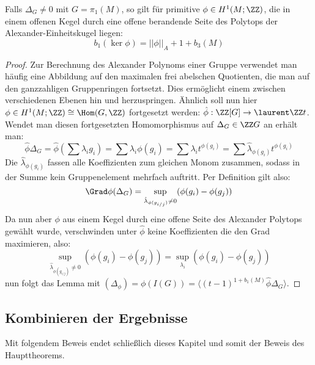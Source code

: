\begin{lem}
\label{lem:alexnorm}
	Falls $\Delta_G \neq 0$ mit $G=\pi_1(M)$, so gilt für primitive $\phi \in H^1(M;\ZZ)$, die in einem offenen Kegel durch eine offene berandende Seite des Polytops der Alexander-Einheitskugel liegen:
	\[
		b_1(\ker\phi) = ||\phi||_A + 1 + b_3(M)
	\]
\end{lem}
\begin{proof}
	Zur Berechnung des Alexander Polynoms einer Gruppe verwendet man häufig eine Abbildung auf den maximalen frei abelschen Quotienten, die man auf den ganzzahligen Gruppenringen fortsetzt. Dies ermöglicht einem zwischen verschiedenen Ebenen hin und herzuspringen. Ähnlich soll nun hier $\phi \in H^1(M;\ZZ) \cong \Hom(G,\ZZ) $ fortgesetzt werden: $		\hat \phi:\ZZ[G] \to \laurent \ZZ t$.\\
	Wendet man diesen fortgesetzten Homomorphismus auf $\Delta_G\in \ZZ G$ an erhält man: \[
		\hat \phi \Delta_G = \hat \phi (\sum \lambda_i g_i)= \sum \lambda_i \phi(g_i) = \sum \lambda_i t^{\phi(g_i)} = \sum \hat \lambda_{\phi(g_i)} t^{\phi(g_i)}
	\]
	Die $\hat \lambda_{\phi(g_i)}$ fassen alle Koeffizienten zum gleichen Monom zusammen, sodass in der Summe kein Gruppenelement mehrfach auftritt. Per Definition gilt also:
	\[
		\Grad \phi(\Delta_G) = \sup_{\hat \lambda_{\phi(g_{i/j})} \neq 0} (\phi(g_i)- \phi(g_j))
	\]
	Da nun aber $\phi$ aus einem Kegel durch eine offene Seite des Alexander Polytops gewählt wurde, verschwinden unter $\hat \phi$ keine Koeffizienten die den Grad maximieren, also:
	\[
		\sup_{\hat \lambda_{\phi(g_{i/j})} \neq 0} (\phi(g_i)- \phi(g_j)) = \sup_{\lambda_i}(\phi(g_i)- \phi(g_j))
	\]
	nun folgt das Lemma mit $(\Delta_\phi)=\phi(I(G))=\langle(t-1)^{1+b_1(M)}\hat\phi\Delta_G \rangle	$.
\end{proof}

\subsection{Kombinieren der Ergebnisse}
    
Mit folgendem Beweis endet schließlich dieses Kapitel und somit der Beweis des Haupttheorems.

